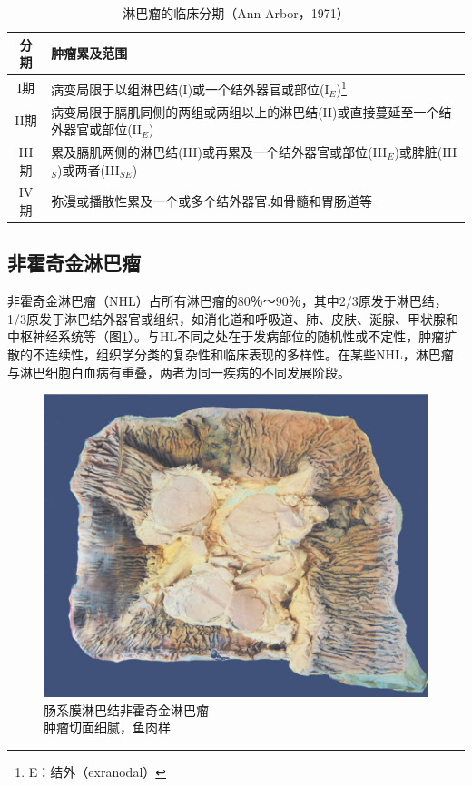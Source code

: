 \begin{longtable}[ht]{cp{7cm}}
    \caption{淋巴瘤的临床分期（Ann Arbor，1971）}
    \label{tab9-2}\\
    \toprule
    分期 & 肿瘤累及范围\\
    \midrule
    I期&病变局限于以组淋巴结(I)或一个结外器官或部位(I$_E$)\footnote{E：结外（exranodal）}\\
II期&病变局限于膈肌同侧的两组或两组以上的淋巴结(II)或直接蔓延至一个结外器官或部位(II$_E$)\\
III期&累及膈肌两侧的淋巴结(III)或再累及一个结外器官或部位(III$_E$)或脾脏(III$_S$)或两者(III$_{SE}$)\\
IV期&弥漫或播散性累及一个或多个结外器官.如骨髓和胃肠道等\\
    \bottomrule
\end{longtable}
      


\subsection{非霍奇金淋巴瘤}

非霍奇金淋巴瘤（NHL）占所有淋巴瘤的80％～90％，其中2/3原发于淋巴结，1/3原发于淋巴结外器官或组织，如消化道和呼吸道、肺、皮肤、涎腺、甲状腺和中枢神经系统等（图\ref{fig9-1}）。与HL不同之处在于发病部位的随机性或不定性，肿瘤扩散的不连续性，组织学分类的复杂性和临床表现的多样性。在某些NHL，淋巴瘤与淋巴细胞白血病有重叠，两者为同一疾病的不同发展阶段。

\begin{figure}[!htbp]
 \centering
 \includegraphics{./images/Image00142.jpg}
 \captionsetup{justification=centering}
 \caption{肠系膜淋巴结非霍奇金淋巴瘤\\ {\small 肿瘤切面细腻，鱼肉样}}
\label{fig9-1}
  \end{figure}

